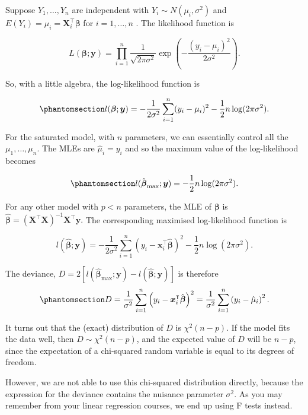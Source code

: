 \documentclass[
  a4paper,
  DIV=11,
  numbers=noendperiod]{scrreprt}
\newenvironment{fbxSimple}[3]{\begin{tcolorbox}[enhanced, breakable,%
attach boxed title to top*={xshift=1.4pt},
boxed title style={boxrule=0.0mm, fuzzy shadow={1pt}{-1pt}{0mm}{0.1mm}{gray}, arc=.3em, rounded corners=east, sharp corners=west}, colframe=#1-color2, colbacktitle=#1-color1, colback = white, coltitle=black,  titlerule=0mm, toprule=0pt, bottomrule=.7pt, leftrule=.3em, rightrule=.7pt, outer arc=.3em,  	left=.5em, right=.5em, bottomtitle=1mm, toptitle=1mm,title=\textbf{#2}\hspace{0.5em}{#3}]}
{\end{tcolorbox}}
\begin{document}
\label{deviance-for-a-normal-linear-model}
\begin{fbxSimple}{Example}{Example 10: }{Deviance for a normal linear model}
\label{deviance-for-a-normal-linear-model}

Suppose \(Y_1, \dots, Y_n\) are independent with
\(Y_i \sim N(\mu_i, \sigma^2)\) and
\(E(Y_i)= \mu_i=\boldsymbol{X}^\intercal_i  \boldsymbol{\beta}\) for
\(i=1,\dots, n\) . The likelihood function is

\[
L(\boldsymbol{\beta};\boldsymbol{y}) = \prod_{i=1}^n \frac{1}{\sqrt{2\pi\sigma^2}} \exp\left(-\frac{(y_i-\mu_i)^2}{2\sigma^2} \right).
 \]

So, with a little algebra, the log-likelihood function is

\begin{equation}\phantomsection\label{eq-normalloglik}{
l(\boldsymbol{\beta}; \boldsymbol{y}) = -\frac{1}{2\sigma^2}\sum_{i=1}^n(y_i -\mu_i)^2 -\frac{1}{2}n \log(2\pi \sigma^2).
}\end{equation}

For the saturated model, with \(n\) parameters, we can essentially
control all the \(\mu_1, \dots, \mu_n\). The MLEs are
\(\hat{\mu}_i=y_i\) and so the maximum value of the log-likelihood
becomes

\begin{equation}\phantomsection\label{eq-normloglikfullmodel}{
l(\hat{\boldsymbol{\beta}}_{\max}; \boldsymbol{y}) =  -\frac{1}{2}n \log(2\pi \sigma^2).
}\end{equation}

For any other model with \(p<n\) parameters, the MLE of
\(\boldsymbol{\beta}\) is
\(\hat{\boldsymbol{\beta}} = (\boldsymbol{X}^\intercal \boldsymbol{X})^{-1} \boldsymbol{X}^\intercal \boldsymbol{y}.\)
The corresponding maximised log-likelihood function is

\[
l(\hat{\boldsymbol{\beta}}; \boldsymbol{y}) = -\frac{1}{2\sigma^2}\sum_{i=1}^n(y_i -\boldsymbol{x}_i^{\intercal} \hat{\boldsymbol{\beta}})^2 -\frac{1}{2}n \log(2\pi \sigma^2).
\]

The deviance,
\(D = 2\left[l(\hat{\boldsymbol{\beta}}_{\max};\boldsymbol{y})-l(\hat{\boldsymbol{\beta}};\boldsymbol{y})\right]\)
is therefore \begin{equation}\phantomsection\label{eq-normaldev}{
D = \frac{1}{\sigma^2}\sum_{i=1}^n \left(y_i-\boldsymbol{x}_i^{\intercal} \hat{\boldsymbol{\beta}}\right)^2  =\frac{1}{\sigma^2} \sum_{i=1}^n \left(y_i-\hat{\mu}_i\right)^2.
}\end{equation}

It turns out that the (exact) distribution of \(D\) is \(\chi^2(n-p)\).
If the model fits the data well, then \(D \sim \chi^2(n-p)\), and the
expected value of \(D\) will be \(n-p\), since the expectation of a
chi-squared random variable is equal to its degrees of freedom.

However, we are not able to use this chi-squared distribution directly,
because the expression for the deviance contains the nuisance parameter
\(\sigma^2\). As you may remember from your linear regression courses,
we end up using F tests instead.

\end{fbxSimple}
\end{document}
